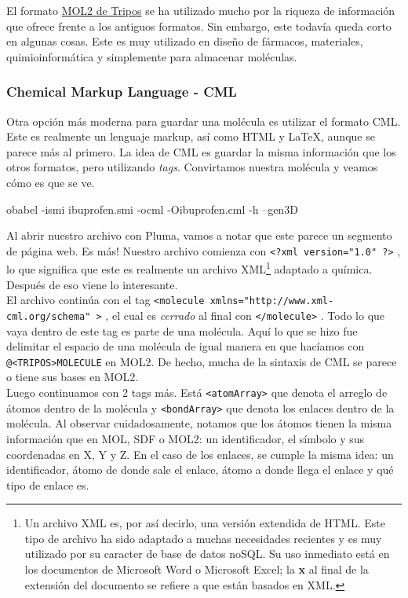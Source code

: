\documentclass[10pt,letterpaper]{article}
\newcommand{\inlinecode}[1]{
\colorbox{light-gray}{\texttt{#1}}
}
\newenvironment{Code}
{
\begin{lrbox}{\selvestebox}%
\begin{minipage}{\dimexpr\columnwidth-2\fboxsep\relax}
\fontfamily{\ttdefault}\selectfont
}
{\end{minipage}\end{lrbox}%
\begin{center}
\colorbox{light-gray}{\usebox{\selvestebox}}
\end{center}
}
\begin{document}
El formato \href{https://app.box.com/s/kyim989nneeg7y4yhjrtdvbkjjl36ecg}{MOL2 de Tripos} se ha utilizado mucho por la riqueza de informaci\'on que ofrece frente a los antiguos formatos. Sin embargo, este todav\'ia queda corto en algunas cosas. Este es muy utilizado en dise\~no de f\'armacos, materiales, quimioinform\'atica y simplemente para almacenar mol\'eculas.

\subsubsection{Chemical Markup Language - CML}
Otra opci\'on m\'as moderna para guardar una mol\'ecula es utilizar el formato CML. Este es realmente un lenguaje markup, as\'i como HTML y \LaTeX, aunque se parece m\'as al primero. La idea de CML es guardar la misma informaci\'on que los otros formatos, pero utilizando \textit{tags}. Convirtamos nuestra mol\'ecula y veamos c\'omo es que se ve.

\begin{Code}
obabel -ismi ibuprofen.smi -ocml -Oibuprofen.cml -h --gen3D
\end{Code}

Al abrir nuestro archivo con Pluma, vamos a notar que este parece un segmento de p\'agina web. Es m\'as! Nuestro archivo comienza con \inlinecode{<?xml version="1.0"\ \hspace*{-2mm}?>}, lo que significa que este es realmente un archivo XML\footnote{Un archivo XML es, por as\'i decirlo, una versi\'on extendida de HTML. Este tipo de archivo ha sido adaptado a muchas necesidades recientes y es muy utilizado por su caracter de base de datos noSQL. Su uso inmediato est\'a en los documentos de Microsoft Word o Microsoft Excel; la \textbf{x} al final de la extensi\'on del documento se refiere a que est\'an basados en XML.} adaptado a qu\'imica. Despu\'es de eso viene lo interesante.\\

El archivo contin\'ua con el tag \inlinecode{<molecule xmlns="http://www.xml-cml.org/schema"\ \hspace*{-2mm}>}, el cual es \emph{cerrado} al final con \inlinecode{</molecule>}. Todo lo que vaya dentro de este tag es parte de una mol\'ecula. Aqu\'i lo que se hizo fue delimitar el espacio de una mol\'ecula de igual manera en que hac\'iamos con \inlinecode{@<TRIPOS>MOLECULE} en MOL2. De hecho, mucha de la sintaxis de CML se parece o tiene sus bases en MOL2.\\

Luego continuamos con 2 tags m\'as. Est\'a \inlinecode{<atomArray>} que denota el arreglo de \'atomos dentro de la mol\'ecula y \inlinecode{<bondArray>} que denota los enlaces dentro de la mol\'ecula. Al observar cuidadosamente, notamos que los \'atomos tienen la misma informaci\'on que en MOL, SDF o MOL2: un identificador, el s\'imbolo y sus coordenadas en X, Y y Z. En el caso de los enlaces, se cumple la misma idea: un identificador, \'atomo de donde sale el enlace, \'atomo a donde llega el enlace y qu\'e tipo de enlace es.\\
\end{document}
